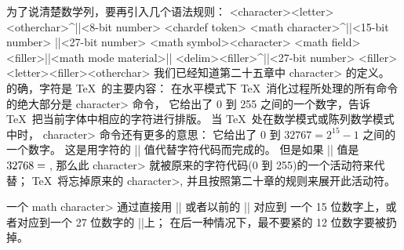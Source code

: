 为了说清楚数学列，要再引入几个语法规则：
\beginsyntax
<character>\is<letter>\alt<otherchar>\alt^|\char|<8-bit number>\alt%
    <chardef token>
<math character>\is^|\mathchar|<15-bit number>
  \alt|\delimiter|<27-bit number>
<math symbol>\is<character>
<math field>\alt<filler>|{|<math mode material>|}|
<delim>\is<filler>^|\delimiter|<27-bit number>
  \alt<filler><letter>\alt<filler><otherchar>
\endsyntax
我们已经知道第二十五章中 \<character> 的定义。%
的确，字符是 \TeX\ 的主要内容：
在水平模式下 \TeX\ 消化过程所处理的所有命令的绝大部分是 \<character> 命令，
它给出了 0 到 255 之间的一个数字，告诉 \TeX\ 把当前字体中相应的字符进行排版。%
当 \TeX\ 处在数学模式或陈列数学模式中时，
\<character> 命令还有更多的意思：
它给出了 0 到 $32767=2^{15}-1$ 之间的一个数字。%
这是用字符的 |\mathcode| 值代替字符代码而完成的。%
但是如果 |\mathcode| 值是 $32768=\null$,
那么此 \<character> 就被原来的字符代码(0 到 255)的一个活动符来代替；
 \TeX\ 将忘掉原来的 \<character>, 并且按照第二十章的规则来展开此活动符。

一个 \<math character> 通过直接用 |\mathchar| 或者以前的 |\mathchardef| 对应到%
一个 15 位数字上，或者对应到一个 27 位数字的 |\delimiter|上；
在后一种情况下，最不要紧的 12 位数字要被扔掉。

